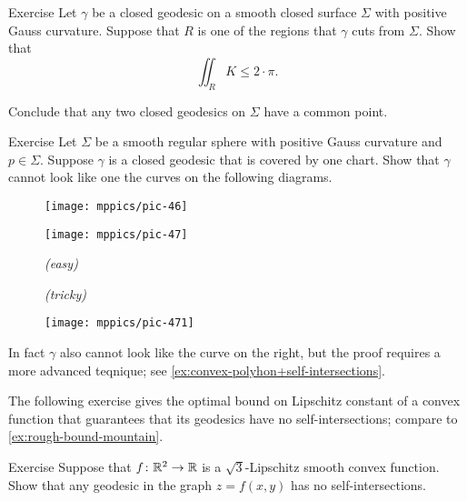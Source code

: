 \begin{thm}{Exercise}\label{ex:closed-geodesic}
Let $\gamma$ be a closed geodesic on a smooth closed surface $\Sigma$ with positive Gauss curvature.
Suppose that $R$ is one of the regions that $\gamma$ cuts from $\Sigma$.
Show that 
\[\iint_R K\le 2\cdot\pi.\]

Conclude that any two closed geodesics on $\Sigma$ have a common point.
\end{thm}

\begin{thm}{Exercise}\label{ex:self-intersections}
Let $\Sigma$ be a smooth regular sphere with positive Gauss curvature and $p\in\Sigma$. 
Suppose $\gamma$ is a closed geodesic that is covered by one chart.
Show that $\gamma$ cannot look like one the curves on the following diagrams.

\begin{figure}[h]
\begin{minipage}{.48\textwidth}
\centering
\texttt{[image: mppics/pic-46]}
\end{minipage}
\hfill
\begin{minipage}{.48\textwidth}
\centering
\texttt{[image: mppics/pic-47]}
\end{minipage}

\medskip

\begin{minipage}{.48\textwidth}
\centering
\caption*{\textit{(easy)}}
\end{minipage}\hfill
\begin{minipage}{.48\textwidth}
\centering
\caption*{\textit{(tricky)}}
\end{minipage}
\vskip-4mm
\end{figure}

\end{thm}


\begin{wrapfigure}{r}{30 mm}
\vskip-0mm
\centering
\texttt{[image: mppics/pic-471]}
\end{wrapfigure}

In fact $\gamma$ also cannot look like the curve on the right, but the proof requires a more advanced teqnique;
see \ref{ex:convex-polyhon+self-intersections}.

The following exercise gives the optimal bound on Lipschitz constant of a convex function that guarantees that its geodesics have no self-intersections;
compare to \ref{ex:rough-bound-mountain}.

\begin{thm}{Exercise}\label{ex:sqrt(3)}
Suppose that $f\colon\mathbb{R}^2\to\mathbb{R}$ is a $\sqrt{3}$-Lipschitz smooth convex function.
Show that any geodesic in the graph $z=f(x,y)$ has no self-intersections.
\end{thm}

